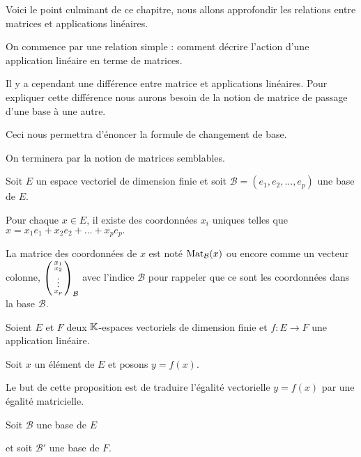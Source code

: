 


\newcommand{\Pass}{\mathop{\text{P}}\nolimits}



\debuttexte

\diapo
\change
Voici le point culminant de ce chapitre, nous allons approfondir les relations entre matrices
et applications linéaires.

\change
On commence par une relation simple : comment décrire l'action d'une application linéaire en terme de matrices.

\change
Il y a cependant une différence entre matrice et applications linéaires.
Pour expliquer cette différence nous aurons besoin de la notion de matrice de passage d'une base à une autre.

\change
Ceci nous permettra d'énoncer la formule de changement de base.

\change
On terminera par la notion de matrices semblables.

\diapo


Soit $E$ un espace vectoriel de dimension finie et
soit $\mathcal{B} = (e_1,e_2, \dots ,e_p )$ une base de $E$. 

\change
Pour chaque $x \in E$, il existe des coordonnées $x_i$ uniques
telles que 
$x=x_1e_1+x_2e_2+\dots +x_p e_p.$

\change
La matrice des coordonnées de $x$ est  
noté $\mathop{\mathrm{Mat}}\nolimits_\mathcal{B} (x)$ ou encore comme un
vecteur colonne, 
$\left(\begin{smallmatrix}x_1\cr x_2\cr \vdots \cr x_p\end{smallmatrix}\right)_\mathcal{B}$
avec l'indice $\mathcal{B}$ pour rappeler que ce sont les coordonnées dans la base $\mathcal{B}$.


\change
Soient $E$ et $F$ deux $\mathbb{K}$-espaces vectoriels de dimension finie
et  $f : E \to F$ une application linéaire. 

\change
Soit $x$ un élément de $E$ et posons $y=f(x)$.

Le but de cette proposition est de traduire l'égalité vectorielle
$y=f (x)$  par une égalité matricielle.

\change
Soit $\mathcal{B}$ une base de $E$ 

\change
et soit $\mathcal{B}'$ une base de $F$.


